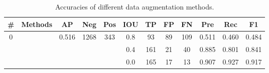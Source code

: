 \documentclass[preprint,12pt,authoryear]{elsarticle}
\begin{document}
\begin{table}[ht]
\footnotesize
\caption{Accuracies of different data augmentation methods.}
\label{table_acc_imgaug}
\begin{tabular}{c c c c  c ccc c c c c}
\toprule
\textbf{\#}&\textbf{Methods}&\textbf{AP}&\textbf{Neg}&\textbf{Pos}&\textbf{IOU}&\textbf{TP}&\textbf{FP}&\textbf{FN}&\textbf{Pre}&\textbf{Rec}&\textbf{F1}\\
\midrule

\multirow{3}{*}{0} &  \multirow{3}{*}{} & \multirow{3}{*}{0.516} & \multirow{3}{*}{1268} & \multirow{3}{*}{343} &0.8 & 93	&89	&109&	0.511 &	0.460& 	0.484  \\
 &  & &  &   & 0.4 & 161&	21	&40	&0.885 &	0.801 &	0.841  \\
 &  & &  &   & 0.0 & 165&	17	&13&	0.907 	&0.927 	&0.917  \\

\hline
\hline


\end{tabular}
\end{table}
\end{document}
